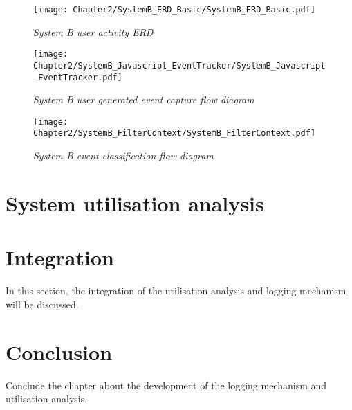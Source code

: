 \begin{figure}[!htb] %
	\centering %
	\texttt{[image: Chapter2/SystemB\_ERD\_Basic/SystemB\_ERD\_Basic.pdf]}
	\caption[System B user activity ERD]
	{\textit{System B user activity ERD}}\label{fig:ch2_SystemB_Basic_ERD}
\end{figure}

\clearpage

\begin{figure}[!htb]
	\centering
	\texttt{[image: Chapter2/SystemB\_Javascript\_EventTracker/SystemB\_Javascript\_EventTracker.pdf]}
	\caption[System B user generated event capture]
	{\textit{System B user generated event capture flow diagram}}\label{fig:CH2_SystemB_EventCapture}
\end{figure}

\clearpage

\begin{figure}[!htb]
	\centering
	\texttt{[image: Chapter2/SystemB\_FilterContext/SystemB\_FilterContext.pdf]}
	\caption[System B event classification]
	{\textit{System B event classification flow diagram}}\label{fig:CH2_SystemB_FilterContext}
\end{figure}

\clearpage

\section{System utilisation analysis}

\section{Integration}
In this section, the integration of the utilisation analysis and logging mechanism will be discussed.

\section{Conclusion}
Conclude the chapter about the development of the logging mechanism and utilisation analysis.

